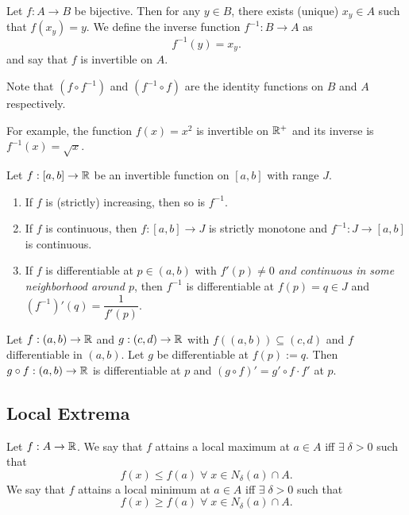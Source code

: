 \documentclass[12pt]{article}
\begin{document}
\begin{defn} \label{defn:diff:inverse}
    Let $f : A \to B$ be bijective. Then for any $y \in B$, there exists (unique) $x_{y} \in A$ such that $f(x_{y}) = y$. We define the inverse function $f^{-1} : B \to A$ as \[
        f^{-1}(y) = x_{y}.
    \] and say that $f$ is invertible on $A$.

    Note that $(f \circ f^{-1})$ and $(f^{-1} \circ f)$ are the identity functions on $B$ and $A$ respectively.
    
    For example, the function $f(x) = x^{2}$ is invertible on $\mathbb{R}^{+}$ and its inverse is $f^{-1}(x) = \sqrt{x}$.
\end{defn}

\begin{thm} \label{thm:diff:inverse}
    Let $f : [a, b] \to \mathbb{R}$ be an invertible function on $[a, b]$ with range $J$.
    \begin{enumerate}[label=(\roman*)]
        \item If $f$ is (strictly) increasing, then so is $f^{-1}$.
        \item If $f$ is continuous, then $f : [a, b] \to J$ is strictly monotone and $f^{-1} : J \to [a, b]$ is continuous.
        \item If $f$ is differentiable at $p \in (a, b)$ with $f'(p) \neq 0$ \emph{and continuous in some neighborhood around $p$}, then $f^{-1}$ is differentiable at $f(p) = q \in J$ and $(f^{-1})'(q) = \dfrac{1}{f'(p)}$.
    \end{enumerate}
\end{thm}

\begin{thm} \label{thm:composition dv}
    Let $f: (a, b) \to \mathbb{R}$ and $g : (c, d) \to \mathbb{R}$ with $f((a, b)) \subseteq (c, d)$ and $f$ differentiable in $(a, b)$. Let $g$ be differentiable at $f(p) := q$. Then $g \circ f : (a, b) \to \mathbb{R}$ is differentiable at $p$ and $(g \circ f)' = g' \circ f \cdot f'$ at $p$.
\end{thm}

\subsection{Local Extrema}

\begin{defn} \label{defn:local extrema}
    Let $f : A \to \mathbb{R}$. We say that $f$ attains a local maximum at $a \in A$ iff $\exists\; \delta > 0$ such that \[
        f(x) \leq f(a) \;\forall\; x \in N_{\delta}(a) \cap A.
    \] We say that $f$ attains a local minimum at $a \in A$ iff $\exists\; \delta > 0$ such that \[
        f(x) \geq f(a) \;\forall\; x \in N_{\delta}(a) \cap A.
    \]
\end{defn}
\end{document}
